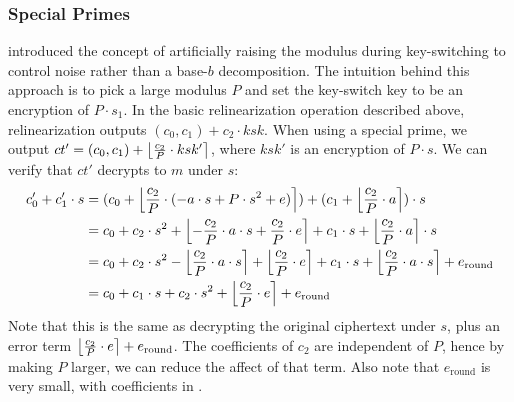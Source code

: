 \documentclass[../../fheimpl.tex]{subfiles}
\begin{document}
\subsubsection{Special Primes}
\label{sec:ks-special-modulus}
\cite{cryptoeprint:2012/099} introduced the concept of artificially raising the modulus during key-switching to control noise rather than a base-$b$ decomposition. The intuition behind this approach is to pick a large modulus $P$ and set the key-switch key to be an encryption of $P\cdot s_1$. In the basic relinearization operation described above, relinearization outputs $(c_0, c_1) + c_2\cdot ksk$. When using a special prime, we output $ct' = (c_0, c_1) + \round*{\frac{c_2}{P}\cdot ksk'}$, where $ksk'$ is an encryption of $P\cdot s$. We can verify that $ct'$ decrypts to $m$ under $s$:
\begin{align*}
	c_0' + c_1'\cdot s &= (c_0 + \round*{\frac{c_2}{P}\cdot(-a\cdot s + P\cdot s^2 + e)}) + (c_1 + \round*{\frac{c_2}{P}\cdot a})\cdot s \\
	&= c_0 + c_2\cdot s^2 + \round*{-\frac{c_2}{P}\cdot a\cdot s + \frac{c_2}{P}\cdot e} + c_1\cdot s + \round*{\frac{c_2}{P}\cdot a}\cdot s \\
	&= c_0 + c_2\cdot s^2 -\round*{\frac{c_2}{P}\cdot a\cdot s} + \round*{\frac{c_2}{P}\cdot e} + c_1\cdot s + \round*{\frac{c_2}{P}\cdot a\cdot s} + e_\mathrm{round} \\
	&= c_0 + c_1\cdot s + c_2\cdot s^2 + \round*{\frac{c_2}{P}\cdot e} + e_\mathrm{round}
\end{align*}
Note that this is the same as decrypting the original ciphertext under $s$, plus an error term $\round*{\frac{c_2}{P}\cdot e} + e_\mathrm{round}$. The coefficients of $c_2$ are independent of $P$, hence by making $P$ larger, we can reduce the affect of that term. Also note that $e_\mathrm{round}$ is very small, with coefficients in . 
\end{document}
